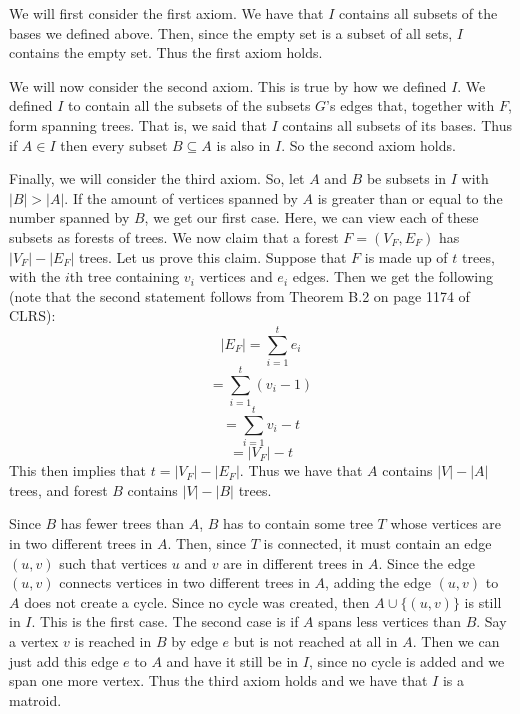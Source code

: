 \documentclass{article}
\begin{document}
\begin{description}
        We will first consider the first axiom. We have that $I$ contains all
        subsets of the bases we defined above. Then, since the empty set is a
        subset of all sets, $I$ contains the empty set. Thus the
        first axiom holds.

        We will now consider the second axiom. This is true by how we defined
        $I$. We defined $I$ to contain all the subsets of the subsets $G$'s edges that, together
        with $F$, form spanning trees. That is, we said that $I$ contains
        all subsets of its bases. Thus if $A \in I$ then every subset $B
        \subseteq A$ is also in $I$. So the second axiom holds.

        Finally, we will consider the third axiom. So, let $A$ and $B$ be
        subsets in $I$ with $|B| > |A|$. If the amount of vertices spanned by
        $A$ is greater than or equal to the number spanned by $B$, we get our
        first case.
        Here, we can view each of these
        subsets as forests of trees. We now claim
        that a forest $F = (V_F,E_F)$ has $|V_F| - |E_F|$ trees. Let us prove
        this claim. Suppose that $F$ is made up of $t$ trees, with the $i$th
        tree containing $v_i$ vertices and $e_i$ edges. Then we get the
        following (note that the second statement follows from Theorem B.2 on
        page 1174 of CLRS):
        \[ |E_F|= \sum_{i=1}^t e_i \]
        \[ = \sum_{i=1}^t (v_i - 1) \]
        \[ = \sum_{i=1}^t v_i - t \]
        \[ = |V_F| - t \]
        This then implies that $t = |V_F| - |E_F|$. Thus we have that $A$
        contains $|V| - |A|$ trees, and forest $B$ contains $|V|-|B|$ trees.

        Since $B$ has fewer trees than $A$, $B$ has to contain some tree
        $T$ whose vertices are in two different trees in $A$. Then, since
        $T$ is connected, it must contain an edge $(u,v)$ such that vertices $u$
        and $v$ are in different trees in $A$. Since the edge $(u,v)$ connects
        vertices in two different trees in $A$, adding the edge $(u,v)$ to
        $A$ does not create a cycle. Since no cycle was created, then $A \cup
        \{(u,v)\}$ is still in $I$. This is the first case. The second case is
        if $A$ spans less vertices than $B$. Say a vertex $v$ is reached in $B$
        by edge $e$ but is not reached at all in $A$. Then we can just add this
        edge $e$ to $A$ and have it still be in $I$, since no cycle is added and
        we span one more vertex. Thus the third axiom holds and we have that
        $I$ is a matroid.



\end{description}
\end{document}
